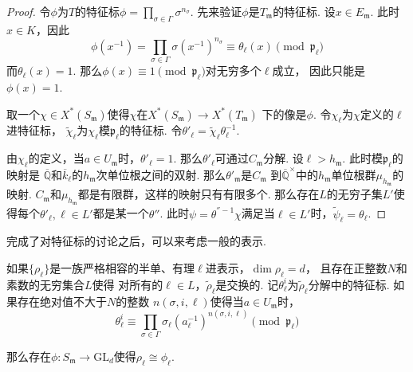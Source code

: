 \begin{proof}
    令$\phi$为$T$的特征标$\phi = \prod_{\sigma\in \Gamma} \sigma^{n_{\sigma}}$.
    先来验证$\phi$是$T_{\mathfrak{m}}$的特征标. 设$x\in E_{\mathfrak{m}}$.
    此时$x\in K$，因此
    \begin{equation}
        \phi(x^{-1}) = \prod_{\sigma\in\Gamma}\sigma(x^{-1})^{n_{\sigma}}
        \equiv \theta_{\ell}(x) \pmod{\mathfrak{p}_{\ell}}
    \end{equation}
    而$\theta_{\ell}(x) = 1$. 那么$\phi(x)\equiv 1\pmod{\mathfrak{p}_{\ell}}$对无穷多个$\ell$成立，
    因此只能是$\phi(x) = 1$.

    取一个$\chi\in X^{*}(S_{\mathfrak{m}})$使得$\chi$在$X^{*}(S_{\mathfrak{m}})\to X^{*}(T_{\mathfrak{m}})$
    下的像是$\phi$. 令$\chi_{\ell}$为$\chi$定义的$\ell$进特征标，
    $\tilde{\chi}_{\ell}$为$\chi_{\ell}$模$\mathfrak{p}_{\ell}$的特征标.
    令$\theta'_{\ell} = \tilde{\chi}_{\ell} \theta_{\ell}^{-1}$.

    由$\chi_{\ell}$的定义，当$a\in U_{\mathfrak{m}}$时，$\theta'_{\ell}=1$.
    那么$\theta'_{\ell}$可通过$C_{\mathfrak{m}}$分解.
    设$\ell > h_{\mathfrak{m}}$.
    此时模$\mathfrak{p}_{\ell}$的映射是
    $\overline{\mathbb{Q}}$和$\overline{k}_{\ell}$的$h_{\mathfrak{m}}$次单位根之间的双射.
    那么$\theta'_{\mathfrak{m}}$是$C_{\mathfrak{m}}$
    到$\overline{\mathbb{Q}}^{\times}$中的$h_{\mathfrak{m}}$单位根群$\mu_{h_{\mathfrak{m}}}$的映射.
    $C_{\mathfrak{m}}$和$\mu_{h_{\mathfrak{m}}}$都是有限群，这样的映射只有有限多个.
    那么存在$L$的无穷子集$L'$使得每个$\theta'_{\ell},\ell\in L'$都是某一个$\theta''$.
    此时$\psi = \theta^{''-1}\chi$满足当$\ell\in L'$时，$\tilde{\psi}_{\ell} = \theta_{\ell}$.
\end{proof}

完成了对特征标的讨论之后，可以来考虑一般的表示.

\begin{cthm}
    如果$\{\rho_{\ell}\}$是一族严格相容的半单、有理$\ell$进表示，$\dim \rho_{\ell} = d$，
    且存在正整数$N$和素数的无穷集合$L$使得
    对所有的$\ell\in L$，$\tilde{\rho}_{\ell}$是交换的. 记$\theta_{\ell}^i$为$\tilde{\rho}_{\ell}$分解中的特征标.
    如果存在绝对值不大于$N$的整数
    $n(\sigma,i,\ell)$使得当$a\in U_{\mathfrak{m}}$时，
    \begin{equation}
        \theta_{\ell}^i \equiv \prod_{\sigma\in \Gamma} \sigma_{\ell}(a_{\ell}^{-1})^{n(\sigma, i, \ell)} \pmod{\mathfrak{p}_{\ell}}
    \end{equation}

    那么存在$\phi:S_{\mathfrak{m}}\to \mathrm{GL}_d$使得$\rho_{\ell}\cong \phi_{\ell}$. \label{surj::main_lemma}
\end{cthm}

